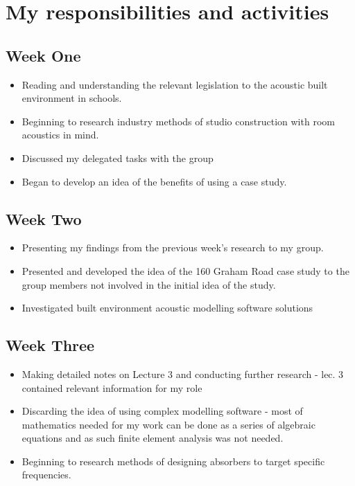 \documentclass[11pt]{article}
\begin{document}
    \section{My responsibilities and activities}
        \subsection{Week One}
            \begin{itemize}
                \item Reading and understanding the relevant legislation to the acoustic built environment in schools.
                \item Beginning to research industry methods of studio construction with room acoustics in mind.
                \item Discussed my delegated tasks with the group
                \item Began to develop an idea of the benefits of using a case study.
            \end{itemize}

        \subsection{Week Two}
            \begin{itemize}
                \item Presenting my findings from the previous week's research to my group.
                \item Presented and developed the idea of the 160 Graham Road case study to the group members not involved in the initial idea of the study.
                \item Investigated built environment acoustic modelling software solutions
            \end{itemize} 

        \subsection{Week Three}
            \begin{itemize}
                \item Making detailed notes on Lecture 3 and conducting further research - lec. 3 contained relevant information for my role
                \item Discarding the idea of using complex modelling software - most of mathematics needed for my work can be done as a series of algebraic equations and as such finite element analysis was not needed.
                \item Beginning to research methods of designing absorbers to target specific frequencies.
            \end{itemize}
\end{document}
